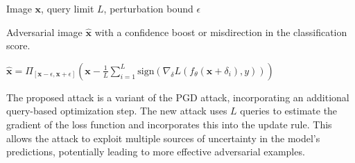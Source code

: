 Image $\mathbf{x}$, query limit $L$, perturbation bound $\epsilon$

Adversarial image $\mathbf{\hat{x}}$ with a confidence boost or misdirection in the classification score.

$\mathbf{\hat{x}} = \Pi_{[\mathbf{x} - \epsilon, \mathbf{x} + \epsilon]}\left(\mathbf{x} - \frac{1}{L}\sum_{i=1}^{L}\text{sign}(\nabla_\delta L(f_\theta(\mathbf{x} + \delta_i), y))\right)$

The proposed attack is a variant of the PGD attack, incorporating an additional query-based optimization step. The new attack uses $L$ queries to estimate the gradient of the loss function and incorporates this into the update rule. This allows the attack to exploit multiple sources of uncertainty in the model's predictions, potentially leading to more effective adversarial examples.